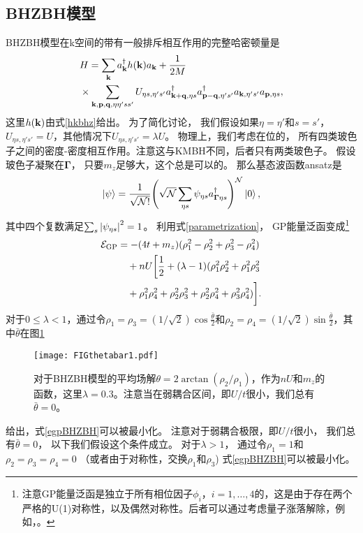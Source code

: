 \subsection{BHZBH模型}
BHZBH模型在k空间的带有一般排斥相互作用的完整哈密顿量是
\begin{equation}\label{BHZBHfullh}
\begin{split}
	&H = \sum_{\vb k}a^\dagger_{\vb k}h(\vb k)a_{\vb k} + \frac{1}{2M}\\
	&\times \sum_{\vb k,\vb p,\vb q,\eta\eta' s s'} U_{\eta s,\eta's'}a^\dagger_{\vb k+\vb q,\eta s}a^\dagger_{\vb p-\vb q,\eta' s'}a_{\vb k,\eta' s'}a_{\vb p,\eta s},
\end{split}
\end{equation}
这里$h(\vb k)$由式\eqref{hkbhz}给出。
为了简化讨论，
我们假设如果$\eta=\eta'$和$s=s'$，$U_{\eta s,\eta' s'}=U$，其他情况下$U_{\eta s,\eta' s'}=\lambda U$。
物理上，我们考虑在位的，
所有四类玻色子之间的密度-密度相互作用。注意这与KMBH不同，后者只有两类玻色子。
假设玻色子凝聚在$\boldsymbol{\Gamma}$，
只要$m_z$足够大，这个总是可以的。
那么基态波函数ansatz是
\begin{equation}
	\ket{\psi}=\frac{1}{\sqrt{\mathcal N!}}\pqty{\sqrt{\mathcal N}\sum_{\eta s}\psi_{\eta s}a_{\boldsymbol{\Gamma}\eta s}^\dagger}^{\mathcal N}\ket{0},\nonumber
\end{equation}
其中四个复数满足$\sum_{s}\abs{\psi_{\eta s}}^2=1$。
利用式\eqref{parametrization}，
GP能量泛函变成\footnote{注意GP能量泛函是独立于所有相位因子$\phi_i$，$i=1,\dots,4$的，这是由于存在两个严格的U(1)对称性，以及偶然对称性。后者可以通过考虑量子涨落解除，例如，\cite{You2012}。}
\begin{equation}\label{egpBHZBH}
	\begin{split}
		\mathcal E_{\textnormal{GP}} &= -(4t+m_z)(\rho_1^2-\rho_2^2+\rho_3^2-\rho_4^2)\\
		&\quad + nU\bigg[\frac{1}{2}+(\lambda-1) (\rho_1^2\rho_2^2 +\rho_1^2\rho_3^2\\
		&\quad + \rho_1^2\rho_4^2 + \rho_2^2\rho_3^2 +\rho_2^2\rho_4^2 + \rho_3^2\rho_4^2)\bigg].
	\end{split}
\end{equation}
对于$0\leq\lambda<1$，通过令$\rho_1=\rho_3=(1/\sqrt{2})\cos\frac{\bar\theta}{2}$和$\rho_2=\rho_4=(1/\sqrt{2})\sin\frac{\bar\theta}{2}$，其中$\bar\theta$在图\ref{BHZBHtheta}%
\begin{figure}
	\texttt{[image: FIGthetabar1.pdf]}
	\caption{\label{BHZBHtheta}对于BHZBH模型的平均场解$\theta=2\arctan(\rho_2/\rho_1)$，作为$nU$和$m_z$的函数，这里$\lambda=0.3$。注意当在弱耦合区间，即$U/t$很小，我们总有$\bar\theta=0$。}
\end{figure}
给出，式\eqref{egpBHZBH}可以被最小化。
注意对于弱耦合极限，即$U/t$很小，
我们总有$\bar\theta=0$，
以下我们假设这个条件成立。
对于$\lambda>1$，
通过令$\rho_1=1$和$\rho_2=\rho_3=\rho_4=0$
（或者由于对称性，交换$\rho_1$和$\rho_3$)
式\eqref{egpBHZBH}可以被最小化。

